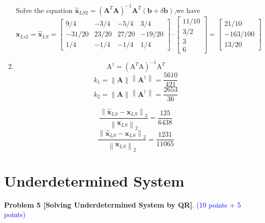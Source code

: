 \documentclass[english,onecolumn]{IEEEtran}
\begin{document}
\begin{enumerate}
	Solve the cquation  $\hat{\mathbf{x}}_{L S2}=\left(\mathbf{A}^{T} \mathbf{A}\right)^{-1} \mathbf{A}^{T}(\mathbf{b}+\delta \mathbf{b})$,we have
	$$
	\mathbf{x}_{Ls2}=\hat{\mathbf{x}}_{L S}=\left[\begin{array}{cccc}
		9 / 4 & -3 / 4 & -5 / 4 & 3 / 4 \\
		-31 / 20 & 23 / 20 & 27 / 20 & -19 / 20 \\
		1 / 4 & -1 / 4 & -1 / 4 & 1 / 4
	\end{array}\right] \cdot\left[\begin{array}{c}
		11 / 10 \\
		3 / 2 \\
		3 \\
		6
	\end{array}\right]=\left[\begin{array}{c}
		21 / 10 \\
		-163 / 100 \\
		13 / 20
	\end{array}\right]
	$$
	
	\item
	$$
		\mathrm{A}^{\dagger}=\left(\mathrm{A}^{T} \mathrm{A}\right)^{-1} \mathrm{A}^{T}
	$$
	$$
	k_{1}=\|\mathbf{A}\|\left\|\mathbf{A}^{\dagger}\right\|=\frac{5610}{421}
	$$
	$$
	k_{2}=\|\mathbf{A}\|\left\|\mathbf{A}^{\dagger}\right\|=\frac{2653}{36} 
	$$

	$$
	\frac{\left\|\hat{\mathbf{x}}_{L S}-\mathbf{x}_{LS}\right\|_{2}}{\left\|\mathbf{x}_{LS} \right\|_{2}}=\frac{125}{6438}
	$$
	$$
\frac{\left\|\hat{\mathbf{x}}_{LS}-\mathbf{x}_{LS}\right\|_{2}}{\left\|\mathbf{x}_{L S}\right\|_{2}}=\frac{1231}{11065}
	$$
\end{enumerate}
	



\newpage
\section{Underdetermined System}

\noindent\textbf{Problem 5 [Solving Underdetermined System by QR]}. \textcolor{blue}{(10 points + 5 points)}
\end{document}
